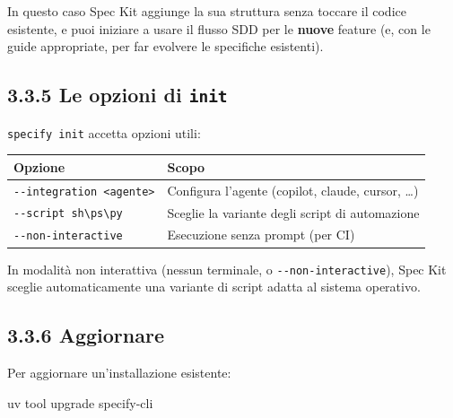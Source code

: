 \documentclass[
  italian,
  10pt,
]{book}
\newenvironment{Shaded}{\begin{snugshade}}{\end{snugshade}}
\newcommand{\ExtensionTok}[1]{#1}
\newcommand{\NormalTok}[1]{#1}
\newcounter{none} %
\begin{document}
In questo caso Spec Kit aggiunge la sua struttura senza toccare il
codice esistente, e puoi iniziare a usare il flusso SDD per le
\textbf{nuove} feature (e, con le guide appropriate, per far evolvere le
specifiche esistenti).

\subsection{\texorpdfstring{3.3.5 Le opzioni di
\texttt{init}}{3.3.5 Le opzioni di init}}\label{le-opzioni-di-init}

\texttt{specify\ init} accetta opzioni utili:

{\def\LTcaptype{none} %
\begin{longtable}[]{@{}
  >{\raggedright\arraybackslash}p{}
  >{\raggedright\arraybackslash}p{}@{}}
\toprule\noalign{}
\begin{minipage}[b]{\linewidth}\raggedright
Opzione
\end{minipage} & \begin{minipage}[b]{\linewidth}\raggedright
Scopo
\end{minipage} \\
\midrule\noalign{}
\endhead
\bottomrule\noalign{}
\endlastfoot
\texttt{-\/-integration\ \textless{}agente\textgreater{}} & Configura
l'agente (copilot, claude, cursor, \ldots) \\
\texttt{-\/-script\ sh\textbackslash{}\textbar{}ps\textbackslash{}\textbar{}py}
& Sceglie la variante degli script di automazione \\
\texttt{-\/-non-interactive} & Esecuzione senza prompt (per CI) \\
\end{longtable}
}

In modalità non interattiva (nessun terminale, o
\texttt{-\/-non-interactive}), Spec Kit sceglie automaticamente una
variante di script adatta al sistema operativo.

\subsection{3.3.6 Aggiornare}\label{aggiornare}

Per aggiornare un'installazione esistente:

\begin{Shaded}
\begin{Highlighting}[]
\ExtensionTok{uv}\NormalTok{ tool upgrade specify{-}cli}
\end{Highlighting}
\end{Shaded}
\end{document}
